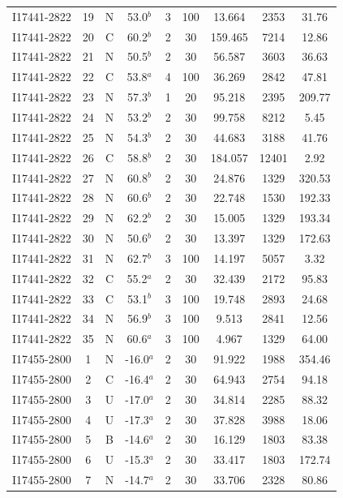 \begin{table}
\begin{tabular}{ccccccccc}
I17441-2822 & 19 & N & 53.0$^{b}$ & 3 & 100 & 13.664 & 2353 & 31.76 \\
I17441-2822 & 20 & C & 60.2$^{b}$ & 2 & 30 & 159.465 & 7214 & 12.86 \\
I17441-2822 & 21 & N & 50.5$^{b}$ & 2 & 30 & 56.587 & 3603 & 36.63 \\
I17441-2822 & 22 & C & 53.8$^{a}$ & 4 & 100 & 36.269 & 2842 & 47.81 \\
I17441-2822 & 23 & N & 57.3$^{b}$ & 1 & 20 & 95.218 & 2395 & 209.77 \\
I17441-2822 & 24 & N & 53.2$^{b}$ & 2 & 30 & 99.758 & 8212 & 5.45 \\
I17441-2822 & 25 & N & 54.3$^{b}$ & 2 & 30 & 44.683 & 3188 & 41.76 \\
I17441-2822 & 26 & C & 58.8$^{b}$ & 2 & 30 & 184.057 & 12401 & 2.92 \\
I17441-2822 & 27 & N & 60.8$^{b}$ & 2 & 30 & 24.876 & 1329 & 320.53 \\
I17441-2822 & 28 & N & 60.6$^{b}$ & 2 & 30 & 22.748 & 1530 & 192.33 \\
I17441-2822 & 29 & N & 62.2$^{b}$ & 2 & 30 & 15.005 & 1329 & 193.34 \\
I17441-2822 & 30 & N & 50.6$^{b}$ & 2 & 30 & 13.397 & 1329 & 172.63 \\
I17441-2822 & 31 & N & 62.7$^{b}$ & 3 & 100 & 14.197 & 5057 & 3.32 \\
I17441-2822 & 32 & C & 55.2$^{a}$ & 2 & 30 & 32.439 & 2172 & 95.83 \\
I17441-2822 & 33 & C & 53.1$^{b}$ & 3 & 100 & 19.748 & 2893 & 24.68 \\
I17441-2822 & 34 & N & 56.9$^{b}$ & 3 & 100 & 9.513 & 2841 & 12.56 \\
I17441-2822 & 35 & N & 60.6$^{a}$ & 3 & 100 & 4.967 & 1329 & 64.00 \\
I17455-2800 & 1 & N & -16.0$^{a}$ & 2 & 30 & 91.922 & 1988 & 354.46 \\
I17455-2800 & 2 & C & -16.4$^{a}$ & 2 & 30 & 64.943 & 2754 & 94.18 \\
I17455-2800 & 3 & U & -17.0$^{a}$ & 2 & 30 & 34.814 & 2285 & 88.32 \\
I17455-2800 & 4 & U & -17.3$^{a}$ & 2 & 30 & 37.828 & 3988 & 18.06 \\
I17455-2800 & 5 & B & -14.6$^{a}$ & 2 & 30 & 16.129 & 1803 & 83.38 \\
I17455-2800 & 6 & U & -15.3$^{a}$ & 2 & 30 & 33.417 & 1803 & 172.74 \\
I17455-2800 & 7 & N & -14.7$^{a}$ & 2 & 30 & 33.706 & 2328 & 80.86 \\

\end{tabular}
\end{table}
